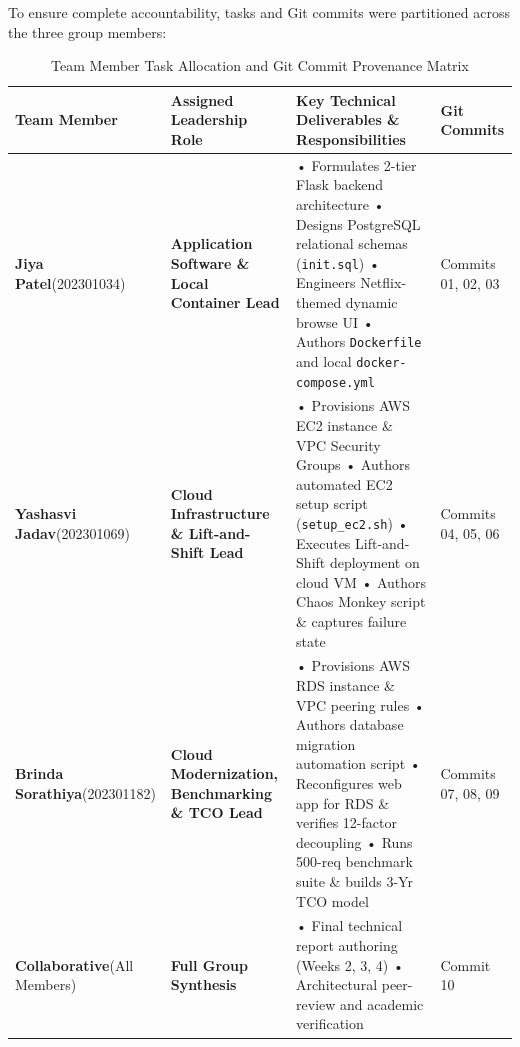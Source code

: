 \documentclass[11pt,a4paper]{article}
\begin{document}
To ensure complete accountability, tasks and Git commits were partitioned across the three group members:

\begin{table}[htbp]
\centering
\small
\caption{Team Member Task Allocation and Git Commit Provenance Matrix}
\label{tab:team_governance}
\begin{tabularx}{\textwidth}{p{2.6cm}p{3.8cm}Xp{2.2cm}}
\toprule
\textbf{Team Member} & \textbf{Assigned Leadership Role} & \textbf{Key Technical Deliverables \& Responsibilities} & \textbf{Git Commits} \\
\midrule
\textbf{Jiya Patel}\newline(202301034) & \textbf{Application Software \& Local Container Lead} & 
• Formulates 2-tier Flask backend architecture\newline
• Designs PostgreSQL relational schemas (\texttt{init.sql})\newline
• Engineers Netflix-themed dynamic browse UI\newline
• Authors \texttt{Dockerfile} and local \texttt{docker-compose.yml} & Commits 01, 02, 03 \\
\addlinespace
\textbf{Yashasvi Jadav}\newline(202301069) & \textbf{Cloud Infrastructure \& Lift-and-Shift Lead} & 
• Provisions AWS EC2 instance \& VPC Security Groups\newline
• Authors automated EC2 setup script (\texttt{setup\_ec2.sh})\newline
• Executes Lift-and-Shift deployment on cloud VM\newline
• Authors Chaos Monkey script \& captures failure state & Commits 04, 05, 06 \\
\addlinespace
\textbf{Brinda Sorathiya}\newline(202301182) & \textbf{Cloud Modernization, Benchmarking \& TCO Lead} & 
• Provisions AWS RDS instance \& VPC peering rules\newline
• Authors database migration automation script\newline
• Reconfigures web app for RDS \& verifies 12-factor decoupling\newline
• Runs 500-req benchmark suite \& builds 3-Yr TCO model & Commits 07, 08, 09 \\
\addlinespace
\textbf{Collaborative}\newline(All Members) & \textbf{Full Group Synthesis} & 
• Final technical report authoring (Weeks 2, 3, 4)\newline
• Architectural peer-review and academic verification & Commit 10 \\
\bottomrule
\end{tabularx}
\end{table}
\end{document}

